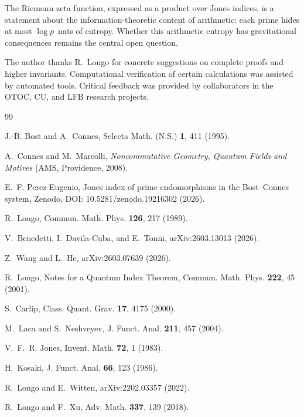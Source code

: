 \documentclass[aps,prl,twocolumn,superscriptaddress,showpacs]{revtex4-2}
\begin{document}
The Riemann zeta function, expressed as a product over Jones indices, is a statement about the information-theoretic content of arithmetic: each prime hides at most $\log p$~nats of entropy. Whether this arithmetic entropy has gravitational consequences remains the central open question.

\begin{acknowledgments}
The author thanks R.~Longo for concrete suggestions on complete proofs and higher invariants. Computational verification of certain calculations was assisted by automated tools. Critical feedback was provided by collaborators in the OTOC, CU, and LFB research projects.
\end{acknowledgments}

\begin{thebibliography}{99}

J.-B. Bost and A.~Connes,
Selecta Math. (N.S.) \textbf{1}, 411 (1995).

A.~Connes and M.~Marcolli,
\textit{Noncommutative Geometry, Quantum Fields and Motives}
(AMS, Providence, 2008).

E.~F. Perez-Eugenio,
Jones index of prime endomorphisms in the Bost--Connes system,
Zenodo, DOI: 10.5281/zenodo.19216302 (2026).

R.~Longo,
Commun. Math. Phys. \textbf{126}, 217 (1989).

V.~Benedetti, I.~Davila-Cuba, and E.~Tonni,
arXiv:2603.13013 (2026).

Z.~Wang and L.~He,
arXiv:2603.07639 (2026).

R.~Longo,
Notes for a Quantum Index Theorem,
Commun. Math. Phys. \textbf{222}, 45 (2001).

S.~Carlip,
Class. Quant. Grav. \textbf{17}, 4175 (2000).

M.~Laca and S.~Neshveyev,
J. Funct. Anal. \textbf{211}, 457 (2004).

V.~F.~R. Jones,
Invent. Math. \textbf{72}, 1 (1983).

H.~Kosaki,
J. Funct. Anal. \textbf{66}, 123 (1986).

R.~Longo and E.~Witten,
arXiv:2202.03357 (2022).

R.~Longo and F.~Xu,
Adv. Math. \textbf{337}, 139 (2018).


\end{thebibliography}
\end{document}
